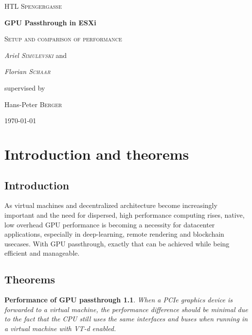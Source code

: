 \documentclass[12pt,a4paper]{report}
\newtheorem*{theorem1}{Performance of GPU passthrough}
\begin{document}
\begin{titlepage}
	\centering
	{\scshape\LARGE HTL Spengergasse \par}
	\vspace{1cm}
	{\huge\bfseries GPU Passthrough in ESXi \par}
	\vspace{1.5cm}
	{\scshape\Large Setup and comparison of performance \par}
	\vspace{2cm}
	{\Large\itshape Ariel \textsc{Simulevski}}
	and
	{\Large\itshape Florian \textsc{Schaar} \par}
	\vfill
	supervised by\par
	Hans-Peter \textsc{Berger}

	\vfill

	{\large \today\par}
\end{titlepage}

\newpage

\tableofcontents

\newpage

\chapter{Introduction and theorems}

\section{Introduction}

As virtual machines and decentralized architecture become increasingly important and the need for dispersed, high performance computing rises, native, low overhead GPU performance is becoming a necessity for datacenter applications, especially in deep-learning, remote rendering and blockchain usecases. With GPU passthrough, exactly that can be achieved while being efficient and manageable.

\section{Theorems}

\begin{theorem1}
When a PCIe graphics device is forwarded to a virtual machine, the performance difference should be minimal due to the fact that the CPU still uses the same interfaces and buses when running in a virtual machine with VT-d enabled.
\end{theorem1}
\end{document}

